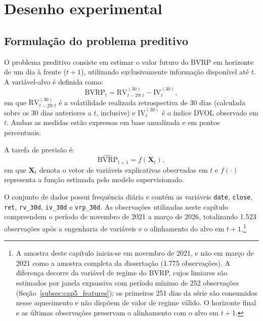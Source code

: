 \section{Desenho experimental}
\label{sec:cap5_desenho}

\subsection{Formulação do problema preditivo}
\label{subsec:cap5_problema}

O problema preditivo consiste em estimar o valor futuro do BVRP em horizonte de
um dia à frente ($t+1$), utilizando exclusivamente informação disponível até $t$.
A variável-alvo é definida como:
\begin{equation}
\text{BVRP}_{t} = \text{RV}_{t-29:t}^{(30)} - \text{IV}_{t}^{(30)},
\label{eq:bvrp_def_cap5}
\end{equation}
em que $\text{RV}_{t-29:t}^{(30)}$ é a volatilidade realizada retrospectiva de 30 dias
(calculada sobre os 30 dias anteriores a $t$, inclusive) e $\text{IV}_{t}^{(30)}$ é
o índice DVOL observado em $t$. Ambas as medidas estão expressas em base anualizada
e em pontos percentuais.

A tarefa de previsão é:
\begin{equation}
\widehat{\text{BVRP}}_{t+1} = f\!\left(\mathbf{X}_t\right),
\end{equation}
em que $\mathbf{X}_t$ denota o vetor de variáveis explicativas observadas em $t$
e $f(\cdot)$ representa a função estimada pelo modelo supervisionado.


O conjunto de dados possui frequência diária e contém as variáveis
\texttt{date}, \texttt{close}, \texttt{ret}, \texttt{rv\_30d}, \texttt{iv\_30d}
e \texttt{vrp\_30d}. As observações utilizadas neste capítulo compreendem o período
de novembro de 2021 a março de 2026, totalizando 1.523 observações após a
engenharia de variáveis e o alinhamento do alvo em $t+1$.\footnote{A amostra deste capítulo inicia-se em novembro
de 2021, e não em março de 2021 como a amostra completa da dissertação (1.775
observações). A diferença decorre da variável de regime do BVRP, cujos
limiares são estimados por janela expansiva com período mínimo de 252 observações
(Seção~\ref{subsec:cap5_features}); os primeiros 251 dias da série são consumidos
nesse aquecimento e não dispõem de valor de regime válido. O horizonte final e as
últimas observações preservam o alinhamento com o alvo em $t+1$.}

